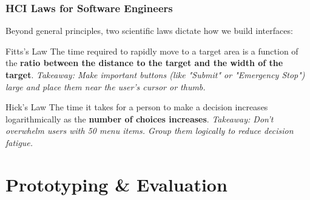 \documentclass[xcolor=table]{beamer}
\begin{document}
\begin{frame}
    \frametitle{HCI Laws for Software Engineers}
    Beyond general principles, two scientific laws dictate how we build interfaces:
    
    \vspace{0.3cm}
    \begin{block}{Fitts's Law}
        The time required to rapidly move to a target area is a function of the \textbf{ratio between the distance to the target and the width of the target}.
        \textit{Takeaway: Make important buttons (like "Submit" or "Emergency Stop") large and place them near the user's cursor or thumb.}
    \end{block}
    
    \begin{block}{Hick's Law}
        The time it takes for a person to make a decision increases logarithmically as the \textbf{number of choices increases}.
        \textit{Takeaway: Don't overwhelm users with 50 menu items. Group them logically to reduce decision fatigue.}
    \end{block}
\end{frame}

\section{Prototyping \& Evaluation}
\end{document}
